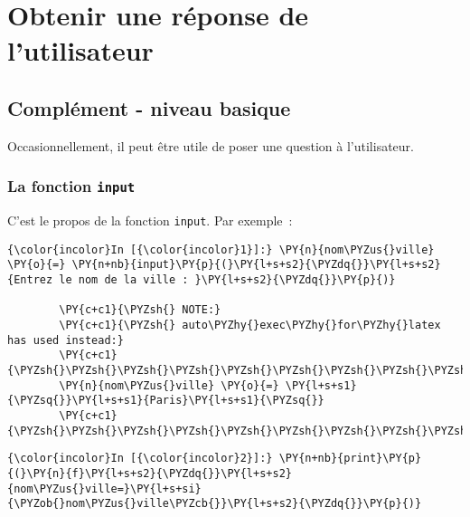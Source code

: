     
    
    
    

    

    \hypertarget{obtenir-une-ruxe9ponse-de-lutilisateur}{%
\section{Obtenir une réponse de
l'utilisateur}\label{obtenir-une-ruxe9ponse-de-lutilisateur}}

    \hypertarget{compluxe9ment---niveau-basique}{%
\subsection{Complément - niveau
basique}\label{compluxe9ment---niveau-basique}}

    Occasionnellement, il peut être utile de poser une question à
l'utilisateur.

    \hypertarget{la-fonction-input}{%
\subsubsection{\texorpdfstring{La fonction
\texttt{input}}{La fonction input}}\label{la-fonction-input}}

    C'est le propos de la fonction \texttt{input}. Par exemple~:

    \begin{Verbatim}[commandchars=\\\{\}]
{\color{incolor}In [{\color{incolor}1}]:} \PY{n}{nom\PYZus{}ville} \PY{o}{=} \PY{n+nb}{input}\PY{p}{(}\PY{l+s+s2}{\PYZdq{}}\PY{l+s+s2}{Entrez le nom de la ville : }\PY{l+s+s2}{\PYZdq{}}\PY{p}{)}
        
        \PY{c+c1}{\PYZsh{} NOTE:}
        \PY{c+c1}{\PYZsh{} auto\PYZhy{}exec\PYZhy{}for\PYZhy{}latex has used instead:}
        \PY{c+c1}{\PYZsh{}\PYZsh{}\PYZsh{}\PYZsh{}\PYZsh{}\PYZsh{}\PYZsh{}\PYZsh{}\PYZsh{}\PYZsh{}}
        \PY{n}{nom\PYZus{}ville} \PY{o}{=} \PY{l+s+s1}{\PYZsq{}}\PY{l+s+s1}{Paris}\PY{l+s+s1}{\PYZsq{}}
        \PY{c+c1}{\PYZsh{}\PYZsh{}\PYZsh{}\PYZsh{}\PYZsh{}\PYZsh{}\PYZsh{}\PYZsh{}\PYZsh{}\PYZsh{}}
\end{Verbatim}


    \begin{Verbatim}[commandchars=\\\{\}]
{\color{incolor}In [{\color{incolor}2}]:} \PY{n+nb}{print}\PY{p}{(}\PY{n}{f}\PY{l+s+s2}{\PYZdq{}}\PY{l+s+s2}{nom\PYZus{}ville=}\PY{l+s+si}{\PYZob{}nom\PYZus{}ville\PYZcb{}}\PY{l+s+s2}{\PYZdq{}}\PY{p}{)}
\end{Verbatim}


